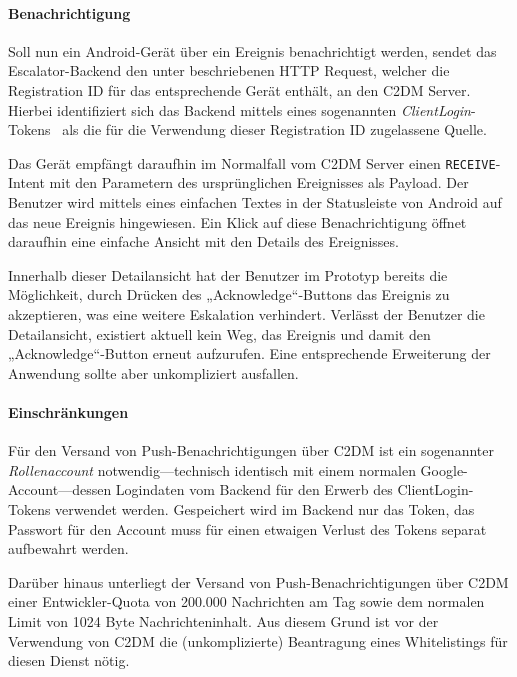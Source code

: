 \documentclass[11pt,utf8,notoc,bibnum,german,final]{zihpub}
\begin{document}
\paragraph{Benachrichtigung}
\label{android-notification}

Soll nun ein Android-Gerät über ein Ereignis benachrichtigt werden, sendet das
Escalator-Backend den unter \cite[\emph{How the Application Server Sends
Messages}]{c2dm} beschriebenen HTTP Request, welcher die Registration ID für
das entsprechende Gerät enthält, an den C2DM Server. Hierbei identifiziert sich
das Backend mittels eines sogenannten
\emph{ClientLogin}-Tokens~\cite{clientlogin} als die für die Verwendung dieser
Registration ID zugelassene Quelle.

Das Gerät empfängt daraufhin im Normalfall vom C2DM Server einen
\texttt{RECEIVE}-Intent mit den Parametern des ursprünglichen Ereignisses als
Payload. Der Benutzer wird mittels eines einfachen Textes in der Statusleiste
von Android auf das neue Ereignis hingewiesen. Ein Klick auf diese
Benachrichtigung öffnet daraufhin eine einfache Ansicht mit den Details des
Ereignisses.

Innerhalb dieser Detailansicht hat der Benutzer im Prototyp bereits die
Möglichkeit, durch Drücken des „Acknowledge“-Buttons das Ereignis zu
akzeptieren, was eine weitere Eskalation verhindert. Verlässt der Benutzer die
Detailansicht, existiert aktuell kein Weg, das Ereignis und damit den
„Acknowledge“-Button erneut aufzurufen. Eine entsprechende Erweiterung der
Anwendung sollte aber unkompliziert ausfallen.

\paragraph{Einschränkungen}

Für den Versand von Push-Benachrichtigungen über C2DM ist ein sogenannter
\emph{Rollenaccount} notwendig—technisch identisch mit einem normalen
Google-Account—dessen Logindaten vom Backend für den Erwerb des
ClientLogin-Tokens verwendet werden. Gespeichert wird im Backend nur das Token,
das Passwort für den Account muss für einen etwaigen Verlust des Tokens separat
aufbewahrt werden.

Darüber hinaus unterliegt der Versand von Push-Benachrichtigungen über C2DM
einer Entwickler-Quota von 200.000 Nachrichten am Tag sowie dem normalen
Limit von 1024 Byte Nachrichteninhalt. Aus diesem Grund ist vor der Verwendung
von C2DM die (unkomplizierte) Beantragung eines Whitelistings für diesen Dienst
nötig.~\cite{c2dm-quotas}
\end{document}
